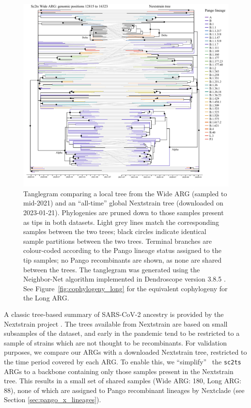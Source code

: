\documentclass{article}
\begin{document}
\begin{figure} \centering
\includegraphics[width=\textwidth]{figures/cophylogeny_wide.pdf}
\caption{\label{fig:cophylogeny}
Tanglegram comparing a local tree from the Wide ARG
(sampled to mid-2021) and an ``all-time'' global Nextstrain tree
(downloaded on 2023-01-21).
Phylogenies are pruned down to those samples present as tips in both datasets. Light grey
lines match the corresponding samples between the two trees; black circles
indicate identical sample partitions between the two trees. Terminal branches
are colour-coded according to the Pango lineage status assigned to the tip
samples; no Pango recombinants are shown, as none are shared between the trees.
The tanglegram was generated using the Neighbor-Net algorithm
\citep{Scornavacca2011-mg} implemented in Dendroscope version 3.8.5
\citep{Huson2012-ys}. See Figure~\ref{fig:cophylogeny_long} for the equivalent
cophylogeny for the Long ARG.}
\end{figure}

A classic tree-based summary of SARS-CoV-2 ancestry is provided
by the Nextstrain project \citep{Hadfield2018-ef}. The trees
available from Nextstrain are based on small subsamples of the
dataset, and early in the pandemic tend to be restricted to
a sample of strains which are not thought to be recombinants.
For validation purposes, we compare our ARGs with
a downloaded Nextstrain tree, restricted to the time period
covered by each ARG. To enable this, we ``simplify''~\citep{Kelleher2018-xc}
the \texttt{sc2ts} ARGs to a backbone containing only those samples
present in the Nextstrain tree. This results in a small set of shared
samples (Wide ARG: 180, Long ARG: 88), none of which are
assigned to Pango recombinant lineages by Nextclade (see Section
\ref{sec:pango_x_lineages}).
\end{document}
